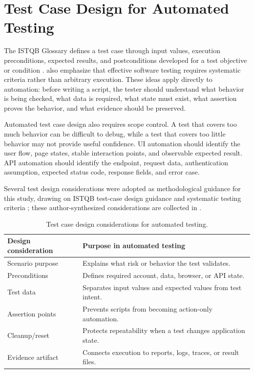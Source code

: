 \section{Test Case Design for Automated Testing}
\label{sec:ch2-test-case-design}

The ISTQB Glossary defines a test case through input values, execution preconditions, expected results, and postconditions developed for a test objective or condition \autocite{istqb_glossary_test_case_2026}. \textcite{ammann_offutt_testing_2016} also emphasize that effective software testing requires systematic criteria rather than arbitrary execution. These ideas apply directly to automation: before writing a script, the tester should understand what behavior is being checked, what data is required, what state must exist, what assertion proves the behavior, and what evidence should be preserved.

Automated test case design also requires scope control. A test that covers too much behavior can be difficult to debug, while a test that covers too little behavior may not provide useful confidence. UI automation should identify the user flow, page states, stable interaction points, and observable expected result. API automation should identify the endpoint, request data, authentication assumption, expected status code, response fields, and error case.

Several test design considerations were adopted as methodological guidance for this study, drawing on ISTQB test-case design guidance \autocite{istqb_glossary_test_case_2026} and systematic testing criteria \autocite{ammann_offutt_testing_2016}; these author-synthesized considerations are collected in .

\begin{table}[htbp]
  \centering
  \tablefont
  \begin{tabularx}{\textwidth}{YY}
    \toprule
    Design consideration & Purpose in automated testing \\
    \midrule
    Scenario purpose & Explains what risk or behavior the test validates. \\
    Preconditions & Defines required account, data, browser, or API state. \\
    Test data & Separates input values and expected values from test intent. \\
    Assertion points & Prevents scripts from becoming action-only automation. \\
    Cleanup/reset & Protects repeatability when a test changes application state. \\
    Evidence artifact & Connects execution to reports, logs, traces, or result files. \\
    \bottomrule
  \end{tabularx}
  \caption{Test case design considerations for automated testing.}
  \label{tab:automated-test-design-considerations}
\end{table}

